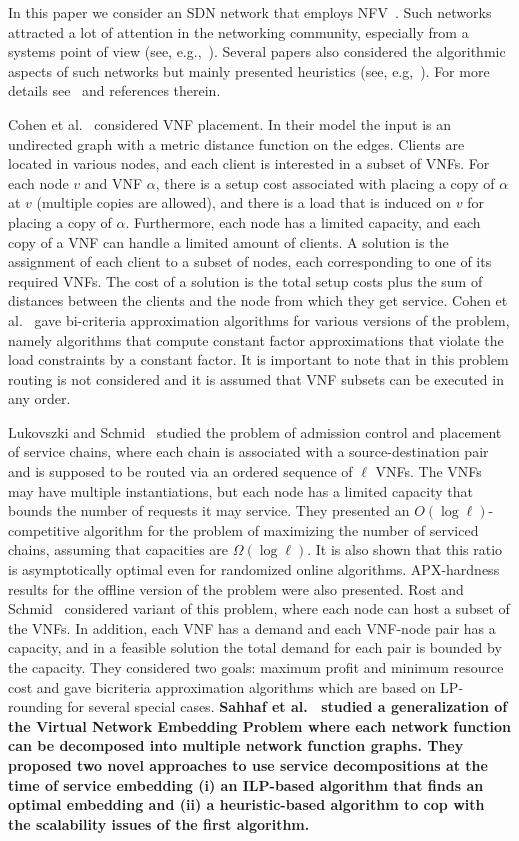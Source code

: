 \documentclass[11pt]{article}
\newcommand{\fix}[1]{{\color{purple}\textbf{#1}}}
\begin{document}
In this paper we consider an SDN network that employs
NFV~\cite{SDN-NFV15}.  Such networks attracted a lot of attention in
the networking community, especially from a systems point of view
(see, e.g.,~\cite{GVPGKDA14,HVSBFTF15}).  Several papers also
considered the algorithmic aspects of such networks but mainly
presented heuristics (see, e.g,~\cite{soule2014merlin}).  For more
details see~\cite{ERS16} and references therein.

Cohen et al.~\cite{CLNR15} considered VNF placement.  In their model
the input is an undirected graph with a metric distance function on
the edges.  Clients are located in various nodes, and each client is
interested in a subset of VNFs.  For each node $v$ and VNF $\alpha$,
there is a setup cost associated with placing a copy of $\alpha$ at
$v$ (multiple copies are allowed), and there is a load that is induced
on $v$ for placing a copy of $\alpha$.  Furthermore, each node has a
limited capacity, and each copy of a VNF can handle a limited amount
of clients.  A solution is the assignment of each client to a subset
of nodes, each corresponding to one of its required VNFs.  The cost of
a solution is the total setup costs plus the sum of distances between
the clients and the node from which they get service.
%
Cohen et al.~\cite{CLNR15} gave bi-criteria approximation algorithms
for various versions of the problem, namely algorithms that compute
constant factor approximations that violate the load constraints by a
constant factor.
%
It is important to note that in this problem routing is not considered
and it is assumed that VNF subsets can be executed in any order.

Lukovszki and Schmid~\cite{LukovszkiSchmid15} studied the problem of
admission control and placement of service chains, where each chain is
associated with a source-destination pair and is supposed to be routed
via an ordered sequence of $\ell$ VNFs.  The VNFs may have multiple
instantiations, but each node has a limited capacity that bounds the
number of requests it may service.
%
They presented an $O(\log \ell)$-competitive algorithm for the problem
of maximizing the number of serviced chains, assuming that capacities
are $\Omega(\log \ell)$.
It is also shown that this ratio is asymptotically optimal even for
randomized online algorithms.  APX-hardness results for the offline
version of the problem were also presented.
%
Rost and Schmid~\cite{RostSchmid16} considered variant of this
problem, where each node can host a subset of the VNFs.  In addition,
each VNF has a demand and each VNF-node pair has a capacity, and in a
feasible solution the total demand for each pair is bounded by the
capacity.  They considered two goals: maximum profit and minimum
resource cost and gave bicriteria approximation algorithms which are
based on LP-rounding for several special cases.
%
\fix{Sahhaf et al.~\cite{SAHHAF2015492} studied a generalization of the Virtual Network Embedding
Problem where each network function can be decomposed into multiple network function graphs.
They proposed two novel approaches to use service
decompositions at the time of service embedding (i) an
ILP-based algorithm that finds an optimal embedding and (ii) a heuristic-based algorithm to cop with the scalability issues of the first algorithm.}
\end{document}

